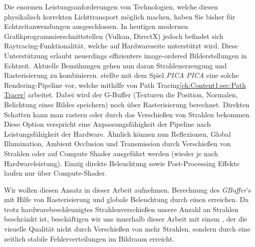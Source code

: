         Die enormen Leistungsanforderungen von Technologien, welche diesen physikalisch korrekten Lichttransport möglich machen, haben Sie bisher für Echtzeitanwendungen ausgeschlossen.
        In heutigen modernen Grafikprogrammierschnittstellen (Vulkan, DirectX) jedoch befindet sich Raytracing-Funktionalität, welche auf Hardwareseite unterstützt wird.
        Diese Unterstützung erlaubt neuerdings effizientere image-ordered Bilderstellungen in Echtzeit.  
        Aktuelle Bemühungen gehen nun daran Strahlenerzeugung und Rasterisierung zu kombinieren. \cite{Barre-Brisebois2019} stellte
        mit dem Spiel \textit{PICA PICA} eine solche Rendering-Pipeline vor, welche mithilfe von Path Tracing\ref{ch:Content1:sec:Path Tracer} arbeitet. Dabei wird der G-Buffer
        (Texturen die Position, Normalen, Belichtung eines Bildes speichern) noch über Rasterisierung berechnet. Direkten Schatten kann man 
        rastern oder durch das Verschießen von Strahlen bekommen. Diese Option verspricht eine Anpassungsfähigkeit der Pipeline nach Leistungsfähigkeit der Hardware. Ähnlich können nun
        Reflexionen, Global Illumination, Ambient Occlusion und Transmission durch Verschießen von Strahlen oder auf Compute Shader ausgeführt werden (wieder je nach 
        Hardwareleistung). Einzig direkte Beleuchtung sowie Post-Processing Effekte laufen nur über Compute-Shader. \par

        Wir wollen diesen Ansatz in dieser Arbeit aufnehmen. Berechnung des \textit{GBuffer}'s mit Hilfe von Rasterisierung und globale Beleuchtung durch 
        einen  erreichen. Da trotz hardwarebeschleunigtes Strahlenverschießen unsere Anzahl an Strahlen beschränkt ist, 
        beschäftigen wir uns innerhalb dieser Arbeit mit einem , der die visuelle Qualität nicht durch Verschießen von mehr Strahlen, 
        sondern durch eine zeitlich stabile  Fehlerverteilungen im Bildraum erreicht.